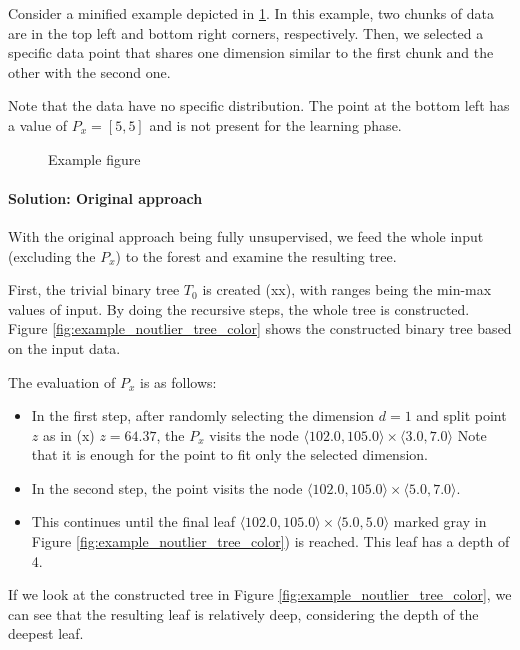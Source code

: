 Consider a minified example depicted in \ref{fig:example_data}. In this example, two chunks of data are in the top left and bottom right corners, respectively. Then, we selected a specific data point that shares one dimension similar to the first chunk and the other with the second one.

Note that the data have no specific distribution. The point at the bottom left has a value of $P_x = [5,5]$ and is not present for the learning phase.

\begin{figure}[htbp]
\centering

\caption{Example figure}
\label{fig:example_data}
\end{figure}



\paragraph{Solution: Original approach}
With the original approach being fully unsupervised, we feed the whole input (excluding the $P_x$) to the forest and examine the resulting tree.

First, the trivial binary tree $T_0$ is created (xx), with ranges being the min-max values of input.
By doing the recursive steps, the whole tree is constructed.
Figure \ref{fig:example_noutlier_tree_color} shows the constructed binary tree based on the input data.

The evaluation of $P_x$ is as follows:
\begin{itemize}
    \item In the first step, after randomly selecting the dimension $d=1$ and split point $z$ as in (x) $z = 64.37$, the $P_x$ visits the node $\langle 102.0, 105.0\rangle \times \langle 3.0, 7.0\rangle$
    Note that it is enough for the point to fit only the selected dimension.
    \item In the second step, the point visits the node $\langle 102.0, 105.0\rangle \times \langle 5.0, 7.0\rangle$.
    \item This continues until the final leaf $\langle 102.0, 105.0\rangle \times \langle 5.0, 5.0\rangle$ marked gray in Figure \ref{fig:example_noutlier_tree_color}) is reached. This leaf has a depth of 4.
    
\end{itemize}


If we look at the constructed tree in Figure \ref{fig:example_noutlier_tree_color}, we can see that the resulting leaf is relatively deep, considering the depth of the deepest leaf.






